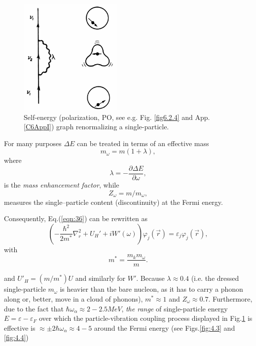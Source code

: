 \begin{figure}[h!]
\centerline {
\includegraphics*[width=5cm]{introduccion/figs/figintroD2}
}
\caption{Self-energy (polarization, PO, see e.g. Fig. \ref{fig6.2.4} and App. \ref{C6AppI}) graph renormalizing  a single-particle.}
\label{fig:4.2}
\end{figure}
For many purposes $\Delta E$ can be treated in terms of an effective mass
\begin{equation}
m_{\omega} = m(1+\lambda),
\label{eqn:38}
\end{equation}
where
\begin{equation}
\lambda= - \frac{\partial \Delta E}{\partial \omega},
\label{eqn:39}
\end{equation}
is the {\it mass enhancement factor}, while
\begin{equation}
\nonumber
Z_{\omega}=m/m_{\omega},
\end{equation}
measures the single--particle content (discontinuity) at the Fermi energy.

Consequently, Eq.(\ref{eqn:36}) can be rewritten as
\begin{equation}
\left( - \frac{\hbar^2}{2m^*} \nabla_r^2 + U_H' + i W'(\omega) \right) \varphi_j(\vec{r}) = \varepsilon_j \varphi_j(\vec{r}),
\label{eqn:40a}
\end{equation}
with
\begin{equation}
m^* = \frac{m_k m_{\omega}}{m} .
\label{eqn:40b}
\end{equation}

\noindent and $U'_H = (m/m^*) U$ and similarly for $W'$. Because $\lambda \approx 0.4$ (i.e. the dressed single-particle $m_{\omega}$ is heavier than the bare nucleon, as it has to carry a phonon along or, better, move in a cloud of phonons), $m^* \approx 1$ and $Z_{\omega} \approx 0.7$. Furthermore, due to the fact that $\hbar \omega_{\alpha} \approx 2-2.5 MeV$, {\it the range} of single-particle energy $E=\varepsilon-\varepsilon_F$ over which the particle-vibration coupling process displayed in Fig.\ref{fig:4.2} is effective is $\approx \pm 2\hbar \omega_{\alpha} \approx 4-5$ around the Fermi energy (see Figs.\ref{fig:4.3} and \ref{fig:4.4})

